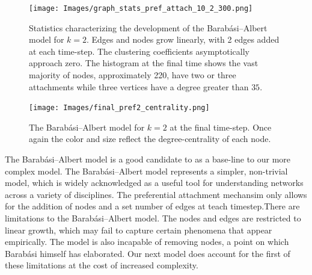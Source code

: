 \begin{figure}[h!]
    \texttt{[image: Images/graph\_stats\_pref\_attach\_10\_2\_300.png]}
    \centering
    \caption{Statistics characterizing the development of the Barabási–Albert model for $k=2$.
    Edges and nodes grow linearly, with 2 edges added at each time-step. The clustering coefficients asymptotically
    approach zero. The histogram at
    the final time shows the vast majority of nodes, approximately 220, have two or three attachments
    while three vertices have a degree greater than $35$.}
\end{figure}

\begin{figure}
    \texttt{[image: Images/final\_pref2\_centrality.png]}
    \centering
    \caption{The Barabási–Albert model for $k=2$ at the final time-step. Once again the color and size
            reflect the degree-centrality of each node.}
\end{figure}






The Barabási–Albert model is a good candidate to as a base-line to our more complex model.
 The Barabási–Albert model 
represents a simpler, non-trivial model, which is widely acknowledged as a useful tool
for understanding networks across a variety of disciplines. The preferential attachment mechansim 
only allows for the addition of nodes and a set number of edges at teach timestep.There are 
limitations to the Barabási–Albert model. The nodes and edges are restricted to linear growth, which
may fail to capture certain phenomena that appear empirically. The model is also incapable
 of removing nodes, a point on which Barabási himself has elaborated. Our next model
 does account for the first of these limitations at the cost of increased complexity.

